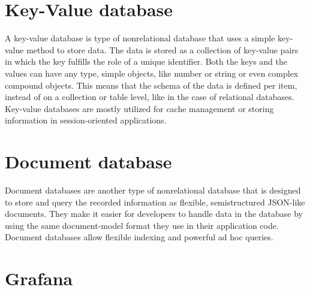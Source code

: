 \section{Key-Value database}


A key-value database is type of nonrelational database that uses a simple key-value method to store data. The data is stored as a collection of key-value pairs in which the key fulfills the role of a unique identifier. Both the keys and the values can have any type, simple objects, like number or string or even complex compound objects. This means that the schema of the data is defined per item, instead of on a collection or table level, like in the case of relational databases. Key-value databases are mostly utilized for cache management or storing information in session-oriented applications.

\section{Document database}


Document databases are another type of nonrelational database that is designed to store and query the recorded information as flexible, semistructured JSON-like documents. They make it easier for developers to handle data in the database by using the same document-model format they use in their application code. Document databases allow flexible indexing and powerful ad hoc queries.



\section{Grafana}

